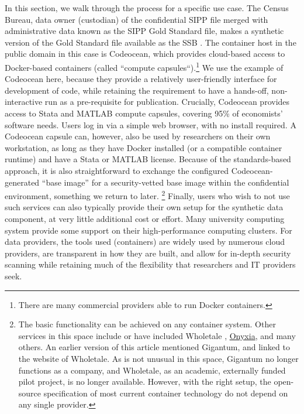 \documentclass[]{hdsr}
\begin{document}
In this section, we walk through the process for a specific use case. The Census Bureau, data owner (custodian) of the confidential SIPP file merged with administrative data known as the SIPP Gold Standard file, makes a synthetic version of the Gold Standard file available as the \ac{SSB} \citep{Benedettoetal_2013}. The container host in the public domain in this case is Codeocean, which provides cloud-based access to Docker-based containers (called ``compute capsules``).\footnote{There are many commercial providers able to run Docker containers.} We use the example of Codeocean here, because they provide a relatively user-friendly interface for development of code, while retaining the requirement to have a hands-off, non-interactive run as a pre-requisite for publication.  Crucially, Codeocean provides access to Stata and MATLAB compute capsules, covering 95\% of economists' software needs. Users log in via a simple web browser, with no install required. A Codeocean capsule can, however, also be used by researchers on their own workstation, as long as they have Docker installed (or a compatible container runtime) and have a Stata or MATLAB license. Because of the standards-based approach, it is also straightforward to exchange the configured Codeocean-generated ``base image'' for a security-vetted base image within the confidential environment, something we return to later.%
%
\footnote{The basic functionality can be achieved on any container system. Other services in this space include  or have included {Wholetale} \citep{brinckman_computing_2018,chard_toward_2020}, \href{https://www.onyxia.sh/}{Onyxia}, and many others. An earlier version of this article mentioned Gigantum, and linked to the website of Wholetale. As is not unusual in this space, Gigantum no longer functions as a company, and Wholetale, as an academic, externally funded pilot project, is no longer available. However, with the right setup, the open-source specification of most current container technology do not depend on any single provider.} 
%
Finally, users who wish to not use such services can also typically provide their own setup for the synthetic data component, at very little additional cost or effort. Many university computing system provide some support on their high-performance computing clusters. For data providers, the tools used (containers) are widely used by numerous cloud providers, are transparent in how they are built, and allow for in-depth security scanning while retaining much of the flexibility that researchers and IT providers seek.
\end{document}
